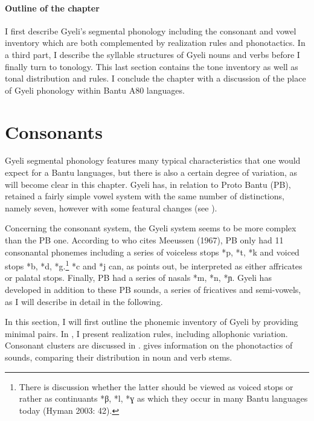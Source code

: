 \paragraph{Outline of the chapter} I first describe Gyeli's segmental phonology including the consonant and vowel inventory which are both complemented by realization rules and  phonotactics. In a third part, I describe the syllable structures of Gyeli nouns and verbs before I finally turn to tonology. This last section contains the tone inventory as well as tonal distribution and rules. I conclude the chapter with a discussion of the place of Gyeli phonology within Bantu A80 languages.



\section{Consonants}
\label{sec:Consonants}

Gyeli segmental phonology features many typical characteristics that one would expect for a Bantu languages, but there is also a certain degree of variation, as will become clear in this chapter. Gyeli has, in relation to Proto Bantu (PB), retained a fairly simple vowel system with the same number of distinctions, namely seven, however with some featural changes (see ).

Concerning the consonant system, the Gyeli system seems to be more complex than the PB one. According to \citet[42]{hyman2003} who cites Meeussen (1967), PB only had 11 consonantal phonemes including a series of voiceless stops *p, *t, *k and voiced stops *b, *d, *g.\footnote{There is discussion whether the latter should be viewed as voiced stops or rather as continuants *β, *l, *ɣ as which they occur in many Bantu languages today (Hyman 2003: 42).} *c and *j  can, as \citet{hyman2003} points out, be interpreted as either affricates or palatal stops. Finally, PB had a series of nasals *m, *n, *ɲ. Gyeli has developed in addition to these PB sounds, a series of fricatives and semi-vowels, as I will describe in detail in the following.


In this section, I will first outline the phonemic inventory of Gyeli by providing minimal pairs. In , I present realization rules, including allophonic variation.  Consonant clusters are discussed in .  gives information on the phonotactics of sounds, comparing their distribution in noun and verb stems. 

